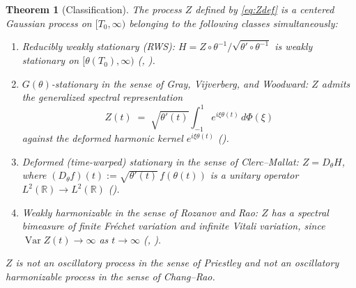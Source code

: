 \documentclass[11pt]{amsart}
\newtheorem{theorem}{Theorem}[section]
\theoremstyle{definition}
\DeclareMathOperator{\Var}{Var}
\begin{document}
\begin{theorem}[Classification]\label{thm:class}
The process $Z$ defined by \eqref{eq:Zdef} is a centered Gaussian process
on $[T_{0},\infty)$ belonging to the following classes simultaneously:
\begin{enumerate}
\item \emph{Reducibly weakly stationary} (RWS): $H = Z\circ\theta^{-1}/\sqrt{\theta'\circ\theta^{-1}}$
is weakly stationary on $[\theta(T_{0}),\infty)$
(\cite[Ch.~4]{Priestley1981}, \cite{GrayWoodward2005}).
\item \emph{$G(\theta)$-stationary} in the sense of Gray, Vijverberg, and
Woodward: $Z$ admits the generalized spectral representation
\begin{equation}\label{eq:gensp}
Z(t) \;=\; \sqrt{\theta'(t)}\int_{-1}^{1}e^{i\xi\theta(t)}\,d\Phi(\xi)
\end{equation}
against the deformed harmonic kernel $e^{i\xi\theta(t)}$
(\cite{GrayWoodward2005}).
\item \emph{Deformed (time-warped) stationary} in the sense of
Clerc--Mallat: $Z = D_{\theta}H$, where
$(D_{\theta}f)(t):=\sqrt{\theta'(t)}\,f(\theta(t))$ is a unitary operator
$L^{2}(\mathbb{R})\to L^{2}(\mathbb{R})$ (\cite{ClercMallat2003}).
\item \emph{Weakly harmonizable} in the sense of Rozanov and Rao: $Z$ has
a spectral bimeasure of finite Fr\'echet variation and infinite Vitali
variation, since $\Var Z(t)\to\infty$ as $t\to\infty$ (\cite{Rao1984},
\cite{Loeve1978}).
\end{enumerate}
$Z$ is \emph{not} an oscillatory process in the sense of Priestley and
\emph{not} an oscillatory harmonizable process in the sense of Chang--Rao.
\end{theorem}
\end{document}
